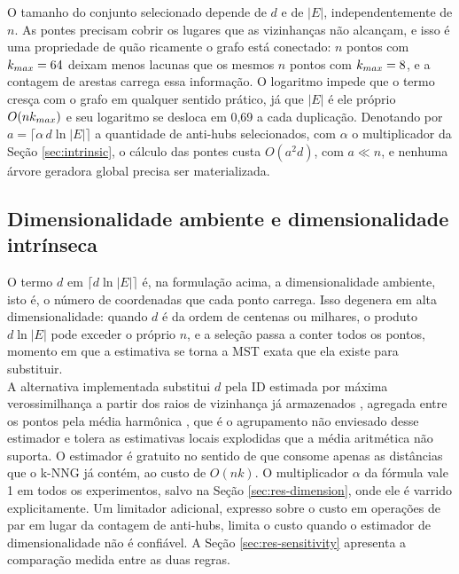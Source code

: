O tamanho do conjunto selecionado depende de $d$ e de $|E|$, independentemente de $n$. As pontes precisam cobrir os lugares que as vizinhanças não alcançam, e isso é uma propriedade de quão ricamente o grafo está conectado: $n$ pontos com $k_{max} = 64$ deixam menos lacunas que os mesmos $n$ pontos com $k_{max} = 8$, e a contagem de arestas carrega essa informação. O logaritmo impede que o termo cresça com o grafo em qualquer sentido prático, já que $|E|$ é ele próprio $O(nk_{max})$ e seu logaritmo se desloca em 0,69 a cada duplicação. Denotando por $a = \lceil \alpha\, d \ln |E| \rceil$ a quantidade de anti-hubs selecionados, com $\alpha$ o multiplicador da Seção \ref{sec:intrinsic}, o cálculo das pontes custa $O(a^2 d)$, com $a \ll n$, e nenhuma árvore geradora global precisa ser materializada.\\

\subsection{Dimensionalidade ambiente e dimensionalidade intrínseca\label{sec:intrinsic}}

O termo $d$ em $\lceil d \ln |E| \rceil$ é, na formulação acima, a dimensionalidade ambiente, isto é, o número de coordenadas que cada ponto carrega. Isso degenera em alta dimensionalidade: quando $d$ é da ordem de centenas ou milhares, o produto $d \ln |E|$ pode exceder o próprio $n$, e a seleção passa a conter todos os pontos, momento em que a estimativa se torna a \ac{MST} exata que ela existe para substituir.\\

A alternativa implementada substitui $d$ pela \ac{ID} estimada por máxima verossimilhança a partir dos raios de vizinhança já armazenados \cite{levina_bickel}, agregada entre os pontos pela média harmônica \cite{mackay_ghahramani}, que é o agrupamento não enviesado desse estimador e tolera as estimativas locais explodidas que a média aritmética não suporta. O estimador é gratuito no sentido de que consome apenas as distâncias que o \ac{k-NNG} já contém, ao custo de $O(n k)$. O multiplicador $\alpha$ da fórmula vale 1 em todos os experimentos, salvo na Seção \ref{sec:res-dimension}, onde ele é varrido explicitamente. Um limitador adicional, expresso sobre o custo em operações de par em lugar da contagem de anti-hubs, limita o custo quando o estimador de dimensionalidade não é confiável. A Seção \ref{sec:res-sensitivity} apresenta a comparação medida entre as duas regras.\\

